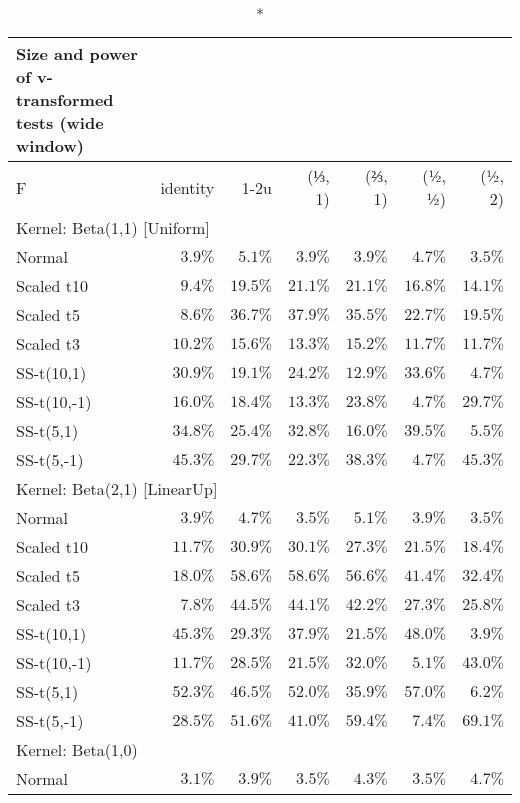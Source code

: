 \setlength{\LTpost}{0mm}
\begin{longtable}{lrrrrrr}
\caption*{
{\large Size and power of v-transformed tests (wide window)}
} \\ 
\toprule
F & identity & \textbar{}1-2u\textbar{} & (⅓, 1) & (⅔, 1) & (½, ½) & (½, 2) \\ 
\midrule
\multicolumn{7}{l}{Kernel: Beta(1,1) [Uniform]} \\ 
\midrule
Normal & $3.9\%$ & $5.1\%$ & $3.9\%$ & $3.9\%$ & $4.7\%$ & $3.5\%$ \\ 
Scaled t10 & $9.4\%$ & $19.5\%$ & $21.1\%$ & $21.1\%$ & $16.8\%$ & $14.1\%$ \\ 
Scaled t5 & $8.6\%$ & $36.7\%$ & $37.9\%$ & $35.5\%$ & $22.7\%$ & $19.5\%$ \\ 
Scaled t3 & $10.2\%$ & $15.6\%$ & $13.3\%$ & $15.2\%$ & $11.7\%$ & $11.7\%$ \\ 
SS-t(10,1) & $30.9\%$ & $19.1\%$ & $24.2\%$ & $12.9\%$ & $33.6\%$ & $4.7\%$ \\ 
SS-t(10,-1) & $16.0\%$ & $18.4\%$ & $13.3\%$ & $23.8\%$ & $4.7\%$ & $29.7\%$ \\ 
SS-t(5,1) & $34.8\%$ & $25.4\%$ & $32.8\%$ & $16.0\%$ & $39.5\%$ & $5.5\%$ \\ 
SS-t(5,-1) & $45.3\%$ & $29.7\%$ & $22.3\%$ & $38.3\%$ & $4.7\%$ & $45.3\%$ \\ 
\midrule
\multicolumn{7}{l}{Kernel: Beta(2,1) [LinearUp]} \\ 
\midrule
Normal & $3.9\%$ & $4.7\%$ & $3.5\%$ & $5.1\%$ & $3.9\%$ & $3.5\%$ \\ 
Scaled t10 & $11.7\%$ & $30.9\%$ & $30.1\%$ & $27.3\%$ & $21.5\%$ & $18.4\%$ \\ 
Scaled t5 & $18.0\%$ & $58.6\%$ & $58.6\%$ & $56.6\%$ & $41.4\%$ & $32.4\%$ \\ 
Scaled t3 & $7.8\%$ & $44.5\%$ & $44.1\%$ & $42.2\%$ & $27.3\%$ & $25.8\%$ \\ 
SS-t(10,1) & $45.3\%$ & $29.3\%$ & $37.9\%$ & $21.5\%$ & $48.0\%$ & $3.9\%$ \\ 
SS-t(10,-1) & $11.7\%$ & $28.5\%$ & $21.5\%$ & $32.0\%$ & $5.1\%$ & $43.0\%$ \\ 
SS-t(5,1) & $52.3\%$ & $46.5\%$ & $52.0\%$ & $35.9\%$ & $57.0\%$ & $6.2\%$ \\ 
SS-t(5,-1) & $28.5\%$ & $51.6\%$ & $41.0\%$ & $59.4\%$ & $7.4\%$ & $69.1\%$ \\ 
\midrule
\multicolumn{7}{l}{Kernel: Beta(1,0)} \\ 
\midrule
Normal & $3.1\%$ & $3.9\%$ & $3.5\%$ & $4.3\%$ & $3.5\%$ & $4.7\%$ \\ 

\end{longtable}
